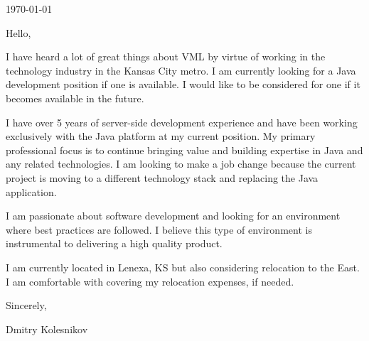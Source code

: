 



\usdate \today \vspace{1cm}

\setlength{\parskip}{11pt}

Hello,

I have heard a lot of great things about VML by virtue of working in the technology industry in the Kansas City metro.  I am currently looking for a Java development position if one is available.  I would like to be considered for one if it becomes available in the future.

I have over 5 years of server-side development experience and have been working exclusively with the Java platform at my current position.  My primary professional focus is to continue bringing value and building expertise in Java and any related technologies.  I am looking to make a job change because the current project is moving to a different technology stack and replacing the Java application.

I am passionate about software development and looking for an environment where best practices are followed. I believe this type of environment is instrumental to delivering a high quality product.

I am currently located in Lenexa, KS but also considering relocation to the East. I am comfortable with covering my relocation expenses, if needed.

\vspace{1cm}

Sincerely,

Dmitry Kolesnikov

